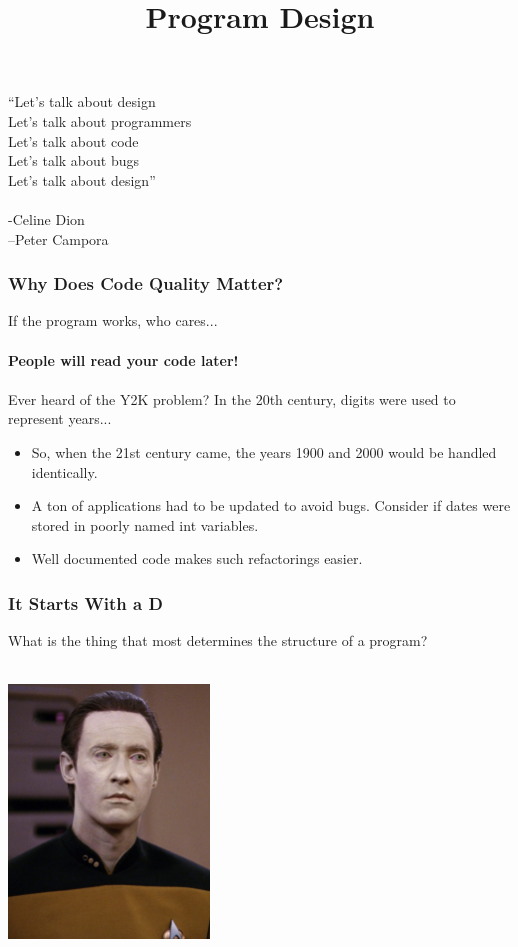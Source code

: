 \documentclass{beamer}
\title{Program Design}
\begin{document}
\begin{frame}
\titlepage
\end{frame}

\begin{frame}
  ``Let's talk about design\\
  Let's talk about programmers\\
  Let's talk about code\\
  Let's talk about bugs\\
  Let's talk about design''\\\\
  -Celine Dion\\
  --Peter Campora
\end{frame}

\begin{frame}
  \frametitle{Why Does Code Quality Matter?}
  \large If the program works, who cares...\\\\
  \pause
  \huge \textbf{People will read your code later!}\\\\
  \pause
  \large Ever heard of the Y2K problem? In the 20th century, digits were used to represent years...
  \begin{itemize}
  \item<4->  So, when the 21st century came, the years 1900 and 2000 would be handled identically.
  \item<5-> A ton of applications had to be updated to avoid bugs. Consider if dates were stored in poorly named int variables.
  \item<6-> Well documented code makes such refactorings easier.
  \end{itemize}
\end{frame}

\begin{frame}
  \frametitle{It Starts With a D}
  \large What is the thing that most determines the structure of a program?\\\\
  \pause
  \begin{center}
    \includegraphics[width=0.4\textwidth]{images/data.jpg}
  \end{center}
\end{frame}
\end{document}
